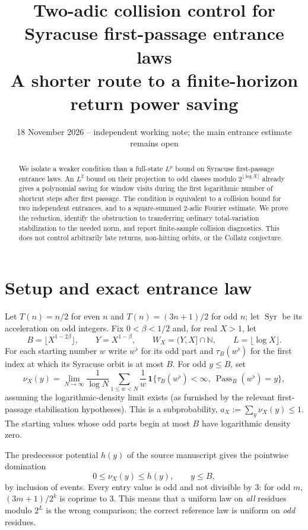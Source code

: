 \documentclass[11pt]{amsart}
\title[Two-adic collisions of Syracuse entrances]{Two-adic collision control for Syracuse first-passage entrance laws\\ A shorter route to a finite-horizon return power saving}
\date{18 November 2026 -- independent working note; the main entrance estimate remains open}
\theoremstyle{remark}
\newcommand{\N}{\mathbb N}
\newcommand{\1}{\mathbf1}
\begin{document}
\begin{abstract}
We isolate a weaker condition than a full-state $L^p$ bound on Syracuse first-passage entrance laws.  An $L^2$ bound on their projection to odd classes modulo $2^{\lfloor\log X\rfloor}$ already gives a polynomial saving for window visits during the first logarithmic number of shortcut steps after first passage.  The condition is equivalent to a collision bound for two independent entrances, and to a square-summed $2$-adic Fourier estimate.  We prove the reduction, identify the obstruction to transferring ordinary total-variation stabilization to the needed norm, and report finite-sample collision diagnostics. This does not control arbitrarily late returns, non-hitting orbits, or the Collatz conjecture.
\end{abstract}
\maketitle
\section{Setup and exact entrance law}
Let $T(n)=n/2$ for even $n$ and $T(n)=(3n+1)/2$ for odd $n$; let $\operatorname{Syr}$ be its acceleration on odd integers. Fix $0<\beta<1/2$ and, for real $X>1$, let
\[
 B=\lfloor X^{1-2\beta}\rfloor,\qquad Y=X^{1-\beta},\qquad W_X=(Y,X]\cap\N,\qquad L=\lfloor\log X\rfloor.
\]
For each starting number $w$ write $w^\flat$ for its odd part and $\tau_B(w^\flat)$ for the first index at which its Syracuse orbit is at most $B$.  For odd $y\le B$, set
\[
 \nu_X(y)=\lim_{N\to\infty}\frac1{\log N}\sum_{1\le w<N}\frac1w\,
 \1\{\tau_B(w^\flat)<\infty,\ \operatorname{Pass}_B(w^\flat)=y\},
\]
assuming the logarithmic-density limit exists (as furnished by the relevant first-passage stabilisation hypotheses). This is a subprobability, $a_X:=\sum_y\nu_X(y)\le1$. The starting values whose odd parts begin at most $B$ have logarithmic density zero.

The predecessor potential $h(y)$ of the source manuscript gives the pointwise domination
\begin{equation}\label{eq:domination}
 0\le\nu_X(y)\le h(y),\qquad y\le B,
\end{equation}
by inclusion of events.  Every entry value is odd and not divisible by $3$: for odd $m$, $(3m+1)/2^k$ is coprime to $3$. This means that a uniform law on \emph{all} residues modulo $2^L$ is the wrong comparison; the correct reference law is uniform on \emph{odd} residues.
\end{document}
